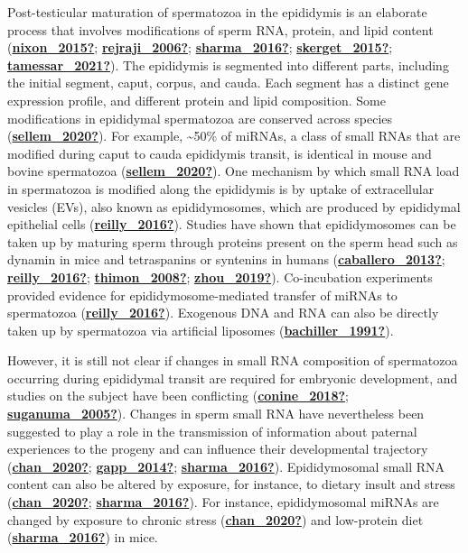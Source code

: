 \documentclass[12pt,twoside]{reedthesis}
\begin{document}
Post-testicular maturation of spermatozoa in the epididymis is an
elaborate process that involves modifications of sperm RNA, protein, and
lipid content (\protect\hyperlink{ref-nixon_2015}{\textbf{nixon\_2015?}}; \protect\hyperlink{ref-rejraji_2006}{\textbf{rejraji\_2006?}}; \protect\hyperlink{ref-sharma_2016}{\textbf{sharma\_2016?}}; \protect\hyperlink{ref-skerget_2015}{\textbf{skerget\_2015?}}; \protect\hyperlink{ref-tamessar_2021}{\textbf{tamessar\_2021?}}). The epididymis is segmented into different parts,
including the initial segment, caput, corpus, and cauda. Each segment
has a distinct gene expression profile, and different protein and lipid
composition. Some modifications in epididymal spermatozoa are conserved
across species (\protect\hyperlink{ref-sellem_2020}{\textbf{sellem\_2020?}}). For example, \textasciitilde50\% of miRNAs, a class of
small RNAs that are modified during caput to cauda epididymis transit,
is identical in mouse and bovine spermatozoa (\protect\hyperlink{ref-sellem_2020}{\textbf{sellem\_2020?}}). One
mechanism by which small RNA load in spermatozoa is modified along the
epididymis is by uptake of extracellular vesicles (EVs), also known as
epididymosomes, which are produced by epididymal epithelial cells
(\protect\hyperlink{ref-reilly_2016}{\textbf{reilly\_2016?}}). Studies have shown that epididymosomes can be taken up
by maturing sperm through proteins present on the sperm head such as
dynamin in mice and tetraspanins or syntenins in humans
(\protect\hyperlink{ref-caballero_2013}{\textbf{caballero\_2013?}}; \protect\hyperlink{ref-reilly_2016}{\textbf{reilly\_2016?}}; \protect\hyperlink{ref-thimon_2008}{\textbf{thimon\_2008?}}; \protect\hyperlink{ref-zhou_2019}{\textbf{zhou\_2019?}}). Co-incubation
experiments provided evidence for epididymosome-mediated transfer of
miRNAs to spermatozoa (\protect\hyperlink{ref-reilly_2016}{\textbf{reilly\_2016?}}). Exogenous DNA and RNA can also be
directly taken up by spermatozoa via artificial liposomes
(\protect\hyperlink{ref-bachiller_1991}{\textbf{bachiller\_1991?}}).

However, it is still not clear if changes in small RNA composition of
spermatozoa occurring during epididymal transit are required for
embryonic development, and studies on the subject have been conflicting
(\protect\hyperlink{ref-conine_2018}{\textbf{conine\_2018?}}; \protect\hyperlink{ref-suganuma_2005}{\textbf{suganuma\_2005?}}). Changes in sperm small RNA have
nevertheless been suggested to play a role in the transmission of
information about paternal experiences to the progeny and can influence
their developmental trajectory (\protect\hyperlink{ref-chan_2020}{\textbf{chan\_2020?}}; \protect\hyperlink{ref-gapp_2014}{\textbf{gapp\_2014?}}; \protect\hyperlink{ref-sharma_2016}{\textbf{sharma\_2016?}}).
Epididymosomal small RNA content can also be altered by exposure, for
instance, to dietary insult and stress (\protect\hyperlink{ref-chan_2020}{\textbf{chan\_2020?}}; \protect\hyperlink{ref-sharma_2016}{\textbf{sharma\_2016?}}). For
instance, epididymosomal miRNAs are changed by exposure to chronic
stress (\protect\hyperlink{ref-chan_2020}{\textbf{chan\_2020?}}) and low-protein diet (\protect\hyperlink{ref-sharma_2016}{\textbf{sharma\_2016?}}) in mice.
\end{document}
